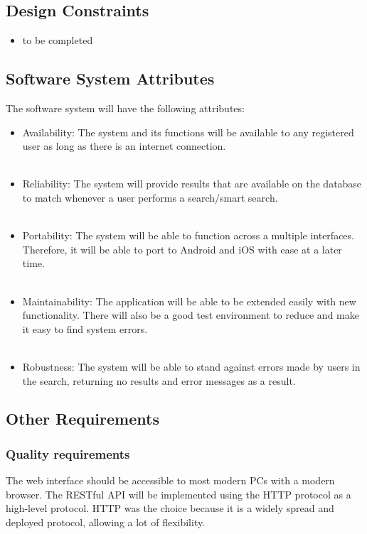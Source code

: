 \documentclass[a4paper,10pt]{article}
\begin{document}
	\subsection{Design Constraints}
	\begin{itemize}
		\item to be completed
	\end{itemize}

	\subsection{Software System Attributes}
	The software system will have the following attributes:
		
		\begin{itemize}
		\item Availability: The system and its functions will be available to any registered user as long as there is an internet connection. 
\\\\
		\item Reliability: The system will provide results that are available on the database to match whenever a user performs a search/smart search.
\\\\
		\item Portability: The system will be able to function across a multiple interfaces. Therefore, it will be able to port to Android and iOS with ease at a later time. 
\\\\
		\item Maintainability: The application will be able to be extended easily with new functionality. There will also be a good test environment to reduce and make it easy to find system errors.  
\\\\
		\item Robustness: The system will be able to stand against errors made by users in the search, returning no results and error messages as a result.
		\end{itemize}
        
	\subsection{Other Requirements}

\subsubsection{Quality requirements}
The web interface should be accessible to most modern PCs with a modern browser.
The RESTful API will be implemented using the HTTP protocol as a high-level protocol. HTTP was the choice because it is a widely spread and deployed protocol, allowing a lot of flexibility. 
\end{document}
